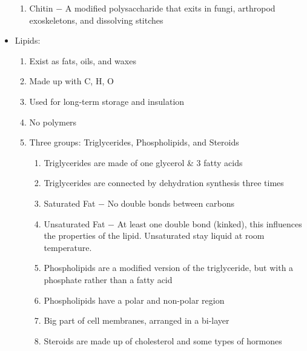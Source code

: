 \documentclass[12pt]{article}
\begin{document}
\begin{itemize}
\begin{enumerate}
      \item Chitin $-$ A modified polysaccharide that exits in fungi, arthropod exoskeletons, and dissolving stitches

    \end{enumerate}

  \item Lipids:

    \begin{enumerate}

      \item Exist as fats, oils, and waxes

      \item Made up with C, H, O

      \item Used for long-term storage and insulation

      \item No polymers

      \item Three groups: Triglycerides, Phospholipids, and Steroids
        
        \begin{enumerate}

          \item Triglycerides are made of one glycerol \& 3 fatty acids

          \item Triglycerides are connected by dehydration synthesis three times

          \item Saturated Fat $-$ No double bonds between carbons

          \item Unsaturated Fat $-$ At least one double bond (kinked), this influences the properties of the lipid. Unsaturated stay liquid at room temperature.

          \item Phospholipids are a modified version of the triglyceride, but with a phosphate rather than a fatty acid

          \item Phospholipids have a polar and non-polar region

          \item Big part of cell membranes, arranged in a bi-layer

          \item Steroids are made up of cholesterol and some types of hormones


\end{enumerate}
\end{enumerate}
\end{itemize}
\end{document}

